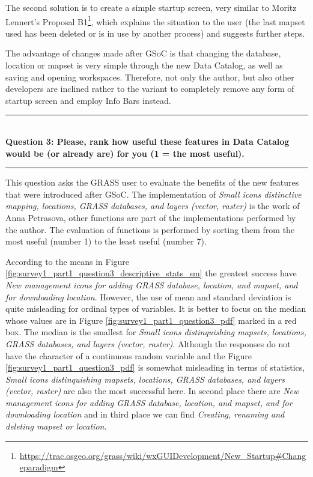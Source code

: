 \documentclass[a4paper,10pt,twoside]{article}
\begin{document}
The second solution is to create a simple startup screen, very similar to Moritz Lennert's Proposal B1\footnote{\url{https://trac.osgeo.org/grass/wiki/wxGUIDevelopment/New\_Startup\#Changeparadigm}}, which explains the situation to the user (the last mapset used has been deleted or is in use by another process) and suggests further steps.

The advantage of changes made after GSoC is that changing the database, location or mapset is very simple through the new Data Catalog, as well as saving and opening workspaces. Therefore, not only the author, but also other developers are inclined rather to the variant to completely remove any form of startup screen and employ Info Bars instead.

\par\noindent\rule{\textwidth}{0.4pt} \\
\noindent \textbf{Question 3: Please, rank how useful these features in Data Catalog would be (or already are) for you (1 = the most useful).}
\par\noindent\rule{\textwidth}{0.4pt}

\noindent This question asks the GRASS user to evaluate the benefits of the new features that were introduced after GSoC. The implementation of \textit{Small icons distinctive mapping, locations, GRASS databases, and layers (vector, raster)} is the work of Anna Petrasova, other functions are part of the implementations performed by the author. The evaluation of functions is performed by sorting them from the most useful (number 1) to the least useful (number 7).

According to the means in Figure \ref{fig:survey1_part1_question3_descriptive_stats_sm} the greatest success have \textit{New management icons for adding GRASS database, location, and mapset, and for downloading location}. However, the use of mean and standard deviation is quite misleading for ordinal types of variables. It is better to focus on the median whose values are in Figure \ref{fig:survey1_part1_question3_pdf} marked in a red box. The median is the smallest for \textit{Small icons distinquishing mapsets, locations, GRASS databases, and layers (vector, raster)}. Although the responses do not have the character of a continuous random variable and the Figure \ref{fig:survey1_part1_question3_pdf} is somewhat misleading in terms of statistics, \textit{Small icons distinquishing mapsets, locations, GRASS databases, and layers (vector, raster) } are also the most successful here. In second place there are \textit{New management icons for adding GRASS database, location, and mapset, and for downloading location} and in third place we can find \textit{Creating, renaming and deleting mapset or location}.
\end{document}
